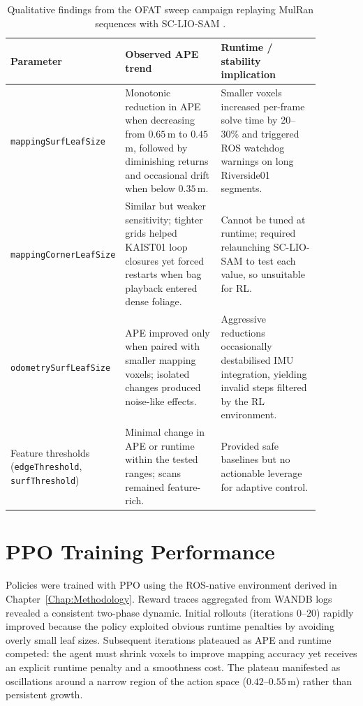 \begin{table}[ht]
    \centering
    \renewcommand{\arraystretch}{1.2}
    \begin{tabular}{p{0.23\linewidth}p{0.32\linewidth}p{0.33\linewidth}}
        \toprule
        \textbf{Parameter} & \textbf{Observed APE trend} & \textbf{Runtime / stability implication} \\
        \midrule
        \texttt{mappingSurfLeafSize} & Monotonic reduction in APE when decreasing from $0.65$\,m to $0.45$\,m, followed by diminishing returns and occasional drift when below $0.35$\,m. & Smaller voxels increased per-frame solve time by 20--30\% and triggered ROS watchdog warnings on long Riverside01 segments. \\
        \texttt{mappingCornerLeafSize} & Similar but weaker sensitivity; tighter grids helped KAIST01 loop closures yet forced restarts when bag playback entered dense foliage. & Cannot be tuned at runtime; required relaunching SC-LIO-SAM to test each value, so unsuitable for RL. \\
        \texttt{odometrySurfLeafSize} & APE improved only when paired with smaller mapping voxels; isolated changes produced noise-like effects. & Aggressive reductions occasionally destabilised IMU integration, yielding invalid steps filtered by the RL environment. \\
        Feature thresholds (\texttt{edgeThreshold}, \texttt{surfThreshold}) & Minimal change in APE or runtime within the tested ranges; scans remained feature-rich. & Provided safe baselines but no actionable leverage for adaptive control. \\
        \bottomrule
    \end{tabular}
    \caption{Qualitative findings from the OFAT sweep campaign replaying MulRan sequences with SC-LIO-SAM \cite{shan_2020_liosam}.}
    \label{tab:sweep_trends}
\end{table}

\section{PPO Training Performance}
Policies were trained with PPO using the ROS-native environment derived in Chapter~\ref{Chap:Methodology}. Reward traces aggregated from WANDB logs revealed a consistent two-phase dynamic. Initial rollouts (iterations $0$--$20$) rapidly improved because the policy exploited obvious runtime penalties by avoiding overly small leaf sizes. Subsequent iterations plateaued as APE and runtime competed: the agent must shrink voxels to improve mapping accuracy yet receives an explicit runtime penalty and a smoothness cost. The plateau manifested as oscillations around a narrow region of the action space ($0.42$--$0.55$\,m) rather than persistent growth.

